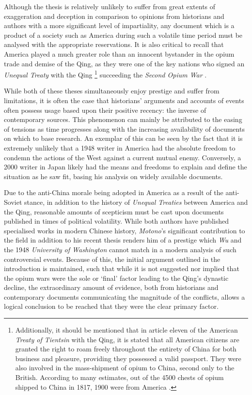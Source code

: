 \documentclass[a4paper,oneside]{article}
\begin{document}
Although the thesis is relatively unlikely to suffer from great extents of
exaggeration and deception in comparison to opinions from historians and authors
with a more significant level of impartiality, any document which is a product
of a society such as America during such a volatile time period must be analysed
with the appropriate reservations. It is also critical to recall that America
played a much greater role than an innocent bystander in the opium trade and
demise of the Qing, as they were one of the key nations who signed an
\textit{Unequal Treaty} with the Qing
\autocite{Peters:1961}\footnote{Additionally, it should be mentioned that in
article eleven of the American \textit{Treaty of Tientsin} with the Qing, it is
stated that all American citizens are granted the right to roam freely
throughout the entirety of China for both business and pleasure, providing they
possessed a valid passport.  They were also involved in the mass-shipment of
opium to China, second only to the British. According to many estimates, out of
the 4500 chests of opium shipped to China in 1817, 1900 were from America
\autocite{Hu:1991}.} succeeding the \textit{Second Opium War}
\autocite{Johnstone:1937}.

While both of these theses simultaneously enjoy prestige and suffer from
limitations, it is often the case that historians' arguments and accounts of
events often possess usage based upon their positive recency: the inverse of
contemporary sources. This phenomenon can mainly be attributed to the easing of
tensions as time progresses along with the increasing availability of documents
on which to base research. An exemplar of this can be seen by the fact that it
is extremely unlikely that a 1948 writer in America had the absolute freedom to
condemn the actions of the West against a current mutual enemy. Conversely, a
2000 writer in Japan likely had the means and freedoms to explain and define the
situation as he saw fit, basing his analysis on widely available documents.

Due to the anti-China morale being adopted in America as a result of the
anti-Soviet stance, in addition to the history of \textit{Unequal Treaties}
between America and the Qing, reasonable amounts of scepticism must be cast upon
documents published in times of political volatility.  While both authors have
published specialised works in modern Chinese history, \textit{Motono}'s
significant contribution to the field in addition to his recent thesis renders
him of a prestige which \textit{Wu} and the 1948 \textit{University of
Washington} cannot match in a modern analysis of such controversial events.
Because of this, the initial argument outlined in the introduction is
maintained, such that while it is not suggested nor implied that the opium wars
were the sole or `final' factor leading to the Qing's dynastic decline, the
extraordinary amount of evidence, both from historians and contemporary
documents communicating the magnitude of the conflicts, allows a logical
conclusion to be reached that they were the clear primary factor.
\end{document}
